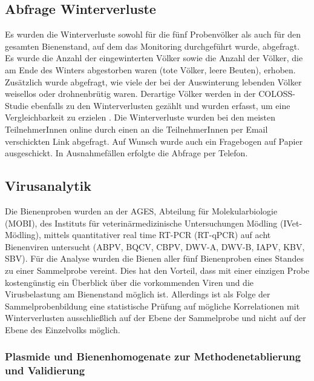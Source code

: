 \subsection{Abfrage Winterverluste} \label{chap:erhebung_winterv}

Es wurden die Winterverluste sowohl für die fünf Probenvölker als auch für den gesamten Bienenstand, auf dem das Monitoring durchgeführt wurde, abgefragt. Es wurde die Anzahl der eingewinterten Völker sowie die Anzahl der Völker, die am Ende des Winters abgestorben waren (tote Völker, leere Beuten), erhoben. Zusätzlich wurde abgefragt, wie viele der bei der Auswinterung lebenden Völker weisellos oder drohnenbrütig waren. Derartige Völker werden in der COLOSS-Studie ebenfalls zu den Winterverlusten gezählt und wurden erfasst, um eine Vergleichbarkeit zu erzielen \citep{brodschneider2016,brodschneider2018}. Die Winterverluste wurden bei den meisten TeilnehmerInnen online durch einen an die TeilnehmerInnen per Email verschickten Link abgefragt. Auf Wunsch wurde auch ein Fragebogen auf Papier ausgeschickt. In Ausnahmefällen erfolgte die Abfrage per Telefon.

\subsection{Virusanalytik} \label{chap:virusanalytik}

Die Bienenproben wurden an der AGES, Abteilung für Molekularbiologie (MOBI), des Instituts für veterinärmedizinische Untersuchungen Mödling (IVet-Mödling), mittels quantitativer real time RT-PCR (RT-qPCR) auf acht Bienenviren untersucht (ABPV, BQCV, CBPV, DWV-A, DWV-B, IAPV, KBV, SBV). 
Für die Analyse wurden die Bienen aller fünf Bienenproben eines Standes zu einer Sammelprobe vereint. Dies hat den Vorteil, dass mit einer einzigen Probe kostengünstig ein Überblick über die vorkommenden Viren und die Virusbelastung am Bienenstand möglich ist. Allerdings ist als Folge der Sammelprobenbildung eine statistische Prüfung auf mögliche Korrelationen mit Winterverlusten ausschließlich auf der Ebene der Sammelprobe und nicht auf der Ebene des Einzelvolks möglich.

\subsubsection{Plasmide und Bienenhomogenate zur Methodenetablierung und Validierung} \label{chap:plasmide_homogenate}

